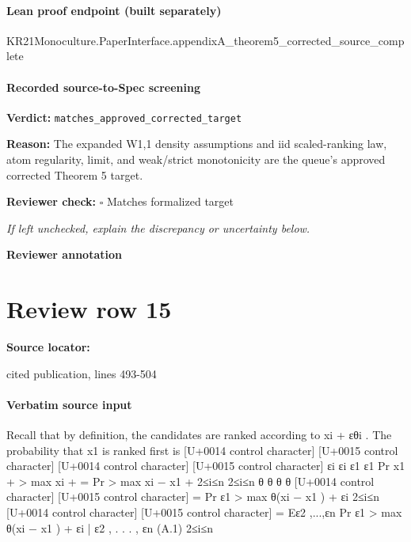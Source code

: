 \documentclass[10pt]{article}
\newcommand{\reviewerbox}{%
  \par\noindent\fbox{\parbox{0.96\linewidth}{\rule{0pt}{0.38in}}}\par
}
\newcommand{\reviewmatch}[1]{%
  \par\noindent\textbf{Reviewer check:} $\square$\; #1\par
  \noindent\emph{If left unchecked, explain the discrepancy or uncertainty below.}\par
}
\begin{document}
\paragraph{Lean proof endpoint (built separately)}\begin{ReviewVerbatim}
KR21Monoculture.PaperInterface.appendixA_theorem5_corrected_source_complete
\end{ReviewVerbatim}

\paragraph{Recorded source-to-Spec screening}
\textbf{Verdict:} \texttt{matches\_approved\_corrected\_target}
\\
{\raggedright
\textbf{Reason:} The expanded W1,1 density assumptions and iid scaled-\allowbreak{}ranking law, atom regularity, limit, and weak/\allowbreak{}strict monotonicity are the queue's approved corrected Theorem 5 target.\allowbreak{}
\par}
\reviewmatch{Matches formalized target}
\noindent\textbf{Reviewer annotation}\par
\reviewerbox
\clearpage
\hypertarget{source-claim-9835a680c6142d09}{}
\section*{Review row 15}
\textbf{Source locator:} {\footnotesize\raggedright cited publication, lines 493-\allowbreak{}504\par}
\paragraph{Verbatim source input}
\begin{ReviewVerbatim}
Recall that by definition, the candidates are ranked according to xi + εθi . The probability that x1 is
ranked first is
[U+0014 control character]
[U+0015 control character]
[U+0014 control character]
[U+0015 control character]
εi
εi
ε1
ε1
Pr x1 +
> max xi +
= Pr
> max xi − x1 +
2≤i≤n
2≤i≤n
θ
θ
θ
θ
[U+0014 control character]
[U+0015 control character]
= Pr ε1 > max θ(xi − x1 ) + εi
2≤i≤n
[U+0014 control character]
[U+0015 control character]
= Eε2 ,...,εn Pr ε1 > max θ(xi − x1 ) + εi | ε2 , . . . , εn
(A.1)
2≤i≤n
\end{ReviewVerbatim}
\end{document}
